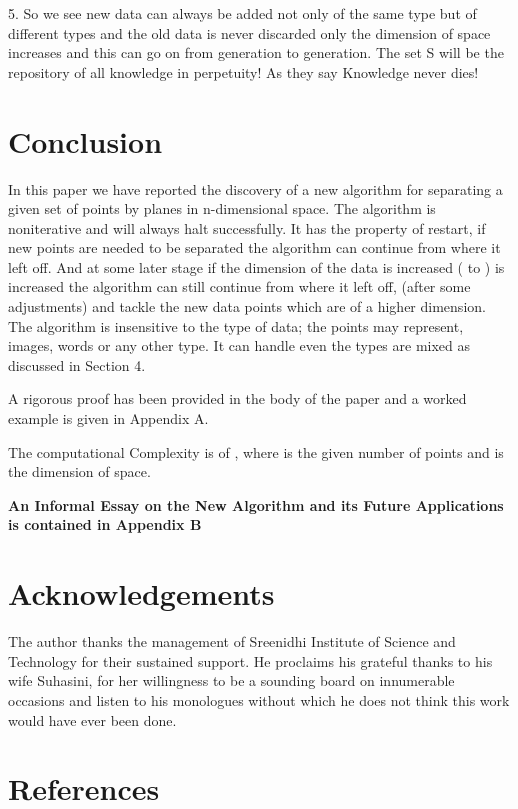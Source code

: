 \documentclass[english]{article}
\begin{document}
5. So we see new data can always be added not only of the same type
but of different types and the old data is never discarded only the
dimension of space increases and this can go on from generation to
generation. The set S will be the repository of all knowledge in perpetuity!
As they say Knowledge never dies!


\section{Conclusion}

In this paper we have reported the discovery of a new algorithm for
separating a given set of  points by planes in n-dimensional
space. The algorithm is noniterative and will always halt successfully.
It has the property of restart, if new points are needed to be separated
the algorithm can continue from where it left off. And at some later
stage if the dimension of the data is increased ( to ) is
increased the algorithm can still continue from where it left off,
(after some adjustments) and tackle the new data points which are
of a higher dimension. The algorithm is insensitive to the type of
data; the points may represent, images, words or any other type. It
can handle even the types are mixed as discussed in Section 4.

A rigorous proof has been provided in the body of the paper and a worked example is given in Appendix A.

 The computational Complexity is of , where  is the given number of points and  is the dimension of space.

\textbf{An Informal Essay on the New Algorithm and its Future Applications is contained in Appendix B}

\section{Acknowledgements}

The author thanks the management of Sreenidhi Institute of Science
and Technology for their sustained support. He proclaims his grateful
thanks to his wife Suhasini, for her willingness to be a sounding
board on innumerable occasions and listen to his monologues without
which he does not think this work would have ever been done.


\section{References}
\end{document}
